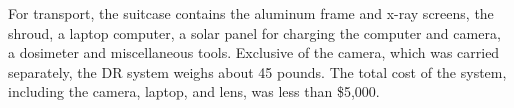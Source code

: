 For transport, the suitcase contains the aluminum frame and x-ray screens, the shroud, a laptop computer, a solar panel for charging the computer and camera, a dosimeter and miscellaneous tools. Exclusive of the camera, which was carried separately, the DR system weighs about 45 pounds. The total cost of the system, including the camera, laptop, and lens, was less than \$5,000.

%
%
%	
%	
%	
%	
%


